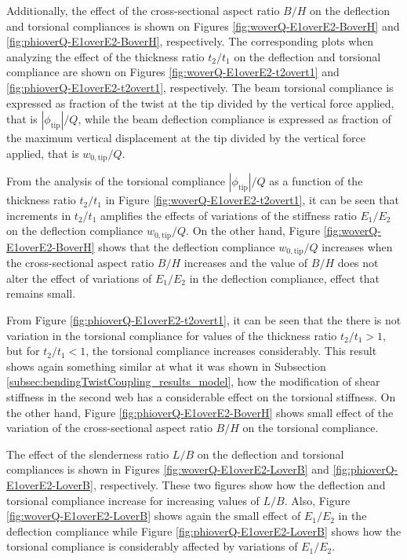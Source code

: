     Additionally, the effect of the cross-sectional aspect ratio $B/H$ on the deflection and torsional compliances is shown on Figures \ref{fig:woverQ-E1overE2-BoverH} and \ref{fig:phioverQ-E1overE2-BoverH}, respectively. The corresponding plots when analyzing the effect of the thickness ratio $t_2/t_1$ on the deflection and torsional compliance are shown on Figures \ref{fig:woverQ-E1overE2-t2overt1} and \ref{fig:phioverQ-E1overE2-t2overt1}, respectively. The beam torsional compliance is expressed as fraction of the twist at the tip divided by the vertical force applied, that is $|\phi_{\mathrm{tip}}| / Q$, while the beam deflection compliance is expressed as fraction of the maximum vertical displacement at the tip divided by the vertical force applied, that is $w_{\mathrm{0,tip}} / Q$.

    From the analysis of the torsional compliance $|\phi_{\mathrm{tip}}| / Q$ as a function of the thickness ratio $t_2/t_1$ in Figure \ref{fig:woverQ-E1overE2-t2overt1}, it can be seen that increments in $t_2/t_1$ amplifies the effects of variations of the stiffness ratio $E_1/E_2$ on the deflection compliance $w_{\mathrm{0,tip}} / Q$. On the other hand, Figure \ref{fig:woverQ-E1overE2-BoverH} shows that the deflection compliance $w_{\mathrm{0,tip}} / Q$ increases when the cross-sectional aspect ratio $B/H$ increases and the value of $B/H$ does not alter the effect of variations of $E_1/E_2$ in the deflection compliance, effect that remains small.

    From Figure \ref{fig:phioverQ-E1overE2-t2overt1}, it can be seen that the there is not variation in the torsional compliance for values of the thickness ratio $t_2/t_1 > 1$, but for $t_2/t_1 < 1$, the torsional compliance increases considerably. This result shows again something similar at what it was shown in Subsection \ref{subsec:bendingTwistCoupling_results_model}, how the modification of shear stiffness in the second web has a considerable effect on the torsional stiffness. On the other hand, Figure \ref{fig:phioverQ-E1overE2-BoverH} shows small effect of the variation of the cross-sectional aspect ratio $B/H$ on the torsional compliance.

    The effect of the slenderness ratio $L/B$ on the deflection and torsional compliances is shown in Figures \ref{fig:woverQ-E1overE2-LoverB} and \ref{fig:phioverQ-E1overE2-LoverB}, respectively. These two figures show how the deflection and torsional compliance increase for increasing values of $L/B$. Also, Figure \ref{fig:woverQ-E1overE2-LoverB} shows again the small effect of $E_1/E_2$ in the deflection compliance while Figure \ref{fig:phioverQ-E1overE2-LoverB} shows how the torsional compliance is considerably affected by variations of $E_1/E_2$.

